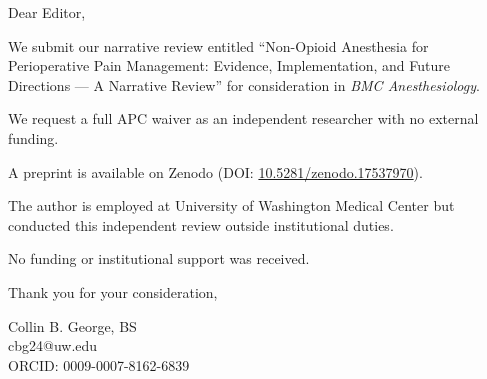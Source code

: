 \documentclass[12pt]{letter}
\date{\today}
\begin{document}
\begin{letter}{}

\opening{Dear Editor,}

We submit our narrative review entitled  
``Non-Opioid Anesthesia for Perioperative Pain Management: Evidence, Implementation, and Future Directions --- A Narrative Review''  
for consideration in \textit{BMC Anesthesiology}.

We request a full APC waiver as an independent researcher with no external funding.

A preprint is available on Zenodo (DOI: \href{https://doi.org/10.5281/zenodo.17538133}{10.5281/zenodo.17537970}).

The author is employed at University of Washington Medical Center but conducted this independent review outside institutional duties.

No funding or institutional support was received.

\closing{Thank you for your consideration,}

\vspace{1cm}
Collin B. George, BS \\
cbg24@uw.edu \\
ORCID: 0009-0007-8162-6839

\end{letter}
\end{document}
